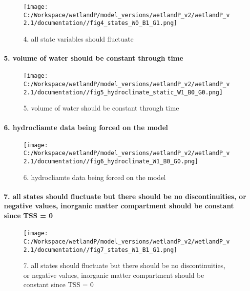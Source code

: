 \documentclass[
]{article}
\begin{document}
\begin{figure}
\centering
\texttt{[image: C:/Workspace/wetlandP/model\_versions/wetlandP\_v2/wetlandP\_v2.1/documentation//fig4\_states\_W0\_B1\_G1.png]}
\caption{4. all state variables should fluctuate}
\end{figure}

\hypertarget{volume-of-water-should-be-constant-through-time}{%
\paragraph{5. volume of water should be constant through
time}\label{volume-of-water-should-be-constant-through-time}}

\begin{figure}
\centering
\texttt{[image: C:/Workspace/wetlandP/model\_versions/wetlandP\_v2/wetlandP\_v2.1/documentation//fig5\_hydroclimate\_static\_W1\_B0\_G0.png]}
\caption{5. volume of water should be constant through time}
\end{figure}

\hypertarget{hydrocliamte-data-being-forced-on-the-model}{%
\paragraph{6. hydrocliamte data being forced on the
model}\label{hydrocliamte-data-being-forced-on-the-model}}

\begin{figure}
\centering
\texttt{[image: C:/Workspace/wetlandP/model\_versions/wetlandP\_v2/wetlandP\_v2.1/documentation//fig6\_hydroclimate\_W1\_B0\_G0.png]}
\caption{6. hydrocliamte data being forced on the model}
\end{figure}

\hypertarget{all-states-should-fluctuate-but-there-should-be-no-discontinuities-or-negative-values-inorganic-matter-compartment-should-be-constant-since-tss-0}{%
\paragraph{7. all states should fluctuate but there should be no
discontinuities, or negative values, inorganic matter compartment should
be constant since TSS =
0}\label{all-states-should-fluctuate-but-there-should-be-no-discontinuities-or-negative-values-inorganic-matter-compartment-should-be-constant-since-tss-0}}

\begin{figure}
\centering
\texttt{[image: C:/Workspace/wetlandP/model\_versions/wetlandP\_v2/wetlandP\_v2.1/documentation//fig7\_states\_W1\_B1\_G1.png]}
\caption{7. all states should fluctuate but there should be no
discontinuities, or negative values, inorganic matter compartment should
be constant since TSS = 0}
\end{figure}
\end{document}
